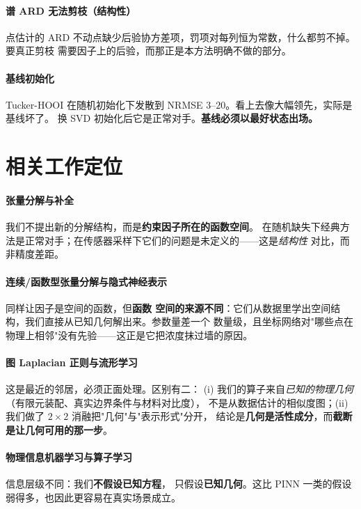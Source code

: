 \documentclass[11pt,a4paper]{article}
\begin{document}
\paragraph{谱 ARD 无法剪枝（结构性）}
点估计的 ARD 不动点缺少后验协方差项，罚项对每列恒为常数，什么都剪不掉。要真正剪枝
需要因子上的后验，而那正是本方法明确不做的部分。

\paragraph{基线初始化}
Tucker-HOOI 在随机初始化下发散到 NRMSE $3$–$20$。看上去像大幅领先，实际是基线坏了。
换 SVD 初始化后它是正常对手。\textbf{基线必须以最好状态出场。}

\section{相关工作定位}

\paragraph{张量分解与补全} 我们不提出新的分解结构，而是\textbf{约束因子所在的函数空间}。
在随机缺失下经典方法是正常对手；在传感器采样下它们的问题是未定义的——这是\emph{结构性}
对比，而非精度差距。

\paragraph{连续/函数型张量分解与隐式神经表示} 同样让因子是空间的函数，但\textbf{函数
空间的来源不同}：它们从数据里学出空间结构，我们直接从已知几何解出来。参数量差一个
数量级，且坐标网络对"哪些点在物理上相邻"没有先验——这正是它把浓度抹过墙的原因。

\paragraph{图 Laplacian 正则与流形学习} 这是最近的邻居，必须正面处理。区别有二：
(i) 我们的算子来自\emph{已知的物理几何}（有限元装配、真实边界条件与材料对比度），
不是从数据估计的相似度图；(ii) 我们做了 $2\times2$ 消融把"几何"与"表示形式"分开，
结论是\textbf{几何是活性成分}，而\textbf{截断是让几何可用的那一步}。

\paragraph{物理信息机器学习与算子学习} 信息层级不同：我们\textbf{不假设已知方程}，
只假设\textbf{已知几何}。这比 PINN 一类的假设弱得多，也因此更容易在真实场景成立。
\end{document}
